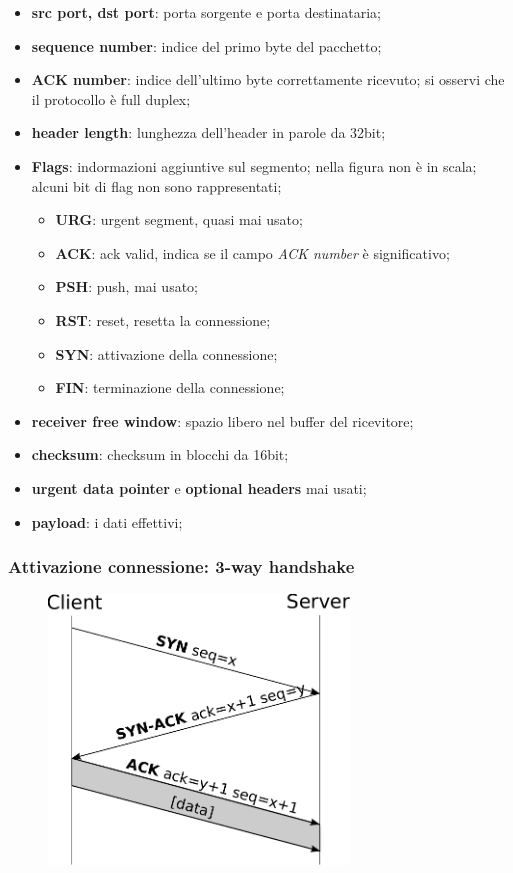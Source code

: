\documentclass[12pt,a4paper]{article}
\begin{document}
\begin{itemize}
  \item \textbf{src port, dst port}: porta sorgente e porta destinataria;
  \item \textbf{sequence number}: indice del primo byte del pacchetto;
  \item \textbf{ACK number}: indice dell'ultimo byte correttamente ricevuto;
    si osservi che il protocollo è full duplex;
  \item \textbf{header length}: lunghezza dell'header in parole da 32bit;
  \item \textbf{Flags}: indormazioni aggiuntive sul segmento; nella figura
    non è in scala; alcuni bit di flag non sono rappresentati;
  \begin{itemize}
    \item \textbf{URG}: urgent segment, quasi mai usato;
    \item \textbf{ACK}: ack valid, indica se il campo \emph{ACK number} è significativo;
    \item \textbf{PSH}: push, mai usato;
    \item \textbf{RST}: reset, resetta la connessione;
    \item \textbf{SYN}: attivazione della connessione;
    \item \textbf{FIN}: terminazione della connessione;
  \end{itemize}
  \item \textbf{receiver free window}: spazio libero nel buffer del
    ricevitore;
  \item \textbf{checksum}: checksum in blocchi da 16bit;
  \item \textbf{urgent data pointer} e \textbf{optional headers} mai usati;
  \item \textbf{payload}: i dati effettivi;
\end{itemize}

\subsubsection{Attivazione connessione: 3-way handshake}
\begin{figure}[H]
\centering
\includegraphics[width=8cm]{img/4/tcp-3way-hs.pdf}
\end{figure}
\end{document}
